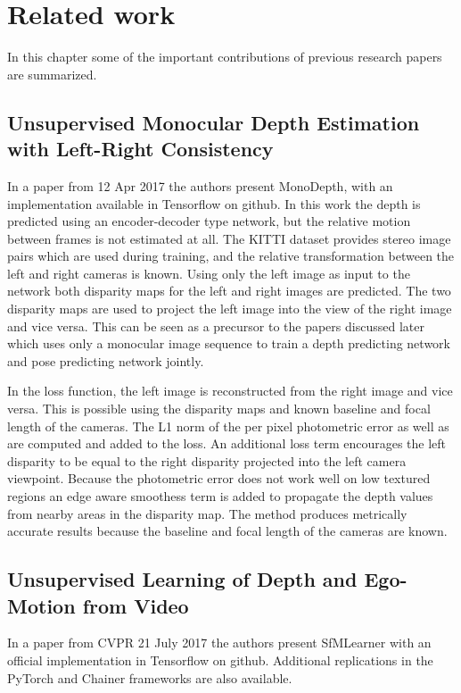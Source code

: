 \chapter{Related work}\label{cha:relatedwork}


In this chapter some of the important contributions of previous research papers are summarized.

\section{Unsupervised Monocular Depth Estimation with Left-Right Consistency}
\label{sec:relwork:leftright}
In a paper\cite{leftright} from 12 Apr 2017 the authors present MonoDepth, with an implementation available in Tensorflow on github. In this work the depth is predicted using an encoder-decoder type network, but the relative motion between frames is not estimated at all. The KITTI dataset provides stereo image pairs which are used during training, and the relative transformation between the left and right cameras is known. Using only the left image as input to the network both disparity maps for the left and right images are predicted. The two disparity maps are used to project the left image into the view of the right image and vice versa. This can be seen as a precursor to the papers discussed later which uses only a monocular image sequence to train a depth predicting network and pose predicting network jointly.

In the loss function, the left image is reconstructed from the right image and vice versa. This is possible using the disparity maps and known baseline and focal length of the cameras. The L1 norm of the per pixel photometric error as well as \abbrSSIM are computed and added to the loss. An additional loss term encourages the left disparity to be equal to the right disparity projected into the left camera viewpoint. Because the photometric error does not work well on low textured regions an edge aware smoothess term is added to propagate the depth values from nearby areas in the disparity map. The method produces metrically accurate results because the baseline and focal length of the cameras are known.

\section{Unsupervised Learning of Depth and Ego-Motion from Video}
\label{sec:relwork:unego}
In a paper\cite{sfmlearner} from CVPR 21 July 2017 the authors present SfMLearner with an official implementation in Tensorflow on github. Additional replications in the PyTorch and Chainer frameworks are also available.

